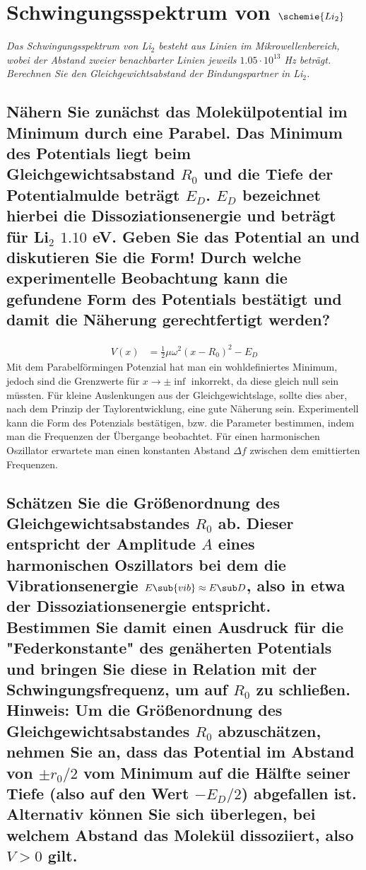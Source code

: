 \documentclass[ex]{exercise_4.1}
\begin{document}
\section{Schwingungsspektrum von \(\schemie{Li_2}\)}
{\it Das Schwingungsspektrum von Li$_2$ besteht aus Linien im Mikrowellenbereich, wobei der Abstand zweier benachbarter Linien jeweils $1.05 \cdot 10^{13}$ Hz beträgt. Berechnen Sie den Gleichgewichtsabstand der Bindungspartner in Li$_2$.}

\subsection{Nähern Sie zunächst das Molekülpotential im Minimum durch eine Parabel. Das Minimum des Potentials liegt beim Gleichgewichtsabstand $R_0$ und die Tiefe der Potentialmulde beträgt $E_D$. $E_D$ bezeichnet hierbei die Dissoziationsenergie und beträgt für Li$_2$ $1.10$ eV. Geben Sie das Potential an und diskutieren Sie die Form! Durch welche experimentelle Beobachtung kann die gefundene Form des Potentials bestätigt und damit die Näherung gerechtfertigt werden?}

\dottedlinete

\begin{align*}
    V(x) 
    &= \frac12\mu  \omega^2 (x- R_0)^2 - E_D
\end{align*}
Mit dem Parabelförmingen Potenzial hat man ein wohldefiniertes Minimum, jedoch sind die Grenzwerte für \(x\to \pm\inf\) inkorrekt, da diese gleich null sein müssten. Für kleine Auslenkungen aus der Gleichgewichtslage, sollte dies aber, nach dem Prinzip der Taylorentwicklung, eine gute Näherung sein. Experimentell kann die Form des Potenzials bestätigen, bzw. die Parameter bestimmen, indem man die Frequenzen der Übergange beobachtet. Für einen harmonischen Oszillator erwartete man einen konstanten Abstand \(\Delta f\) zwischen dem emittierten Frequenzen.

\subsection{Schätzen Sie die Größenordnung des Gleichgewichtsabstandes $R_0$ ab. Dieser entspricht der Amplitude $A$ eines harmonischen Oszillators bei dem die Vibrationsenergie $E\sub{vib} \approx E\sub D$, also in etwa der Dissoziationsenergie entspricht. \\
Bestimmen Sie damit einen Ausdruck für die "{}Federkonstante"{} des genäherten Potentials und bringen Sie diese in Relation mit der Schwingungsfrequenz, um auf $R_0$ zu schließen. \\
Hinweis: Um die Größenordnung des Gleichgewichtsabstandes $R_0$ abzuschätzen, nehmen Sie an, dass das Potential im Abstand von $\pm r_0/2$ vom Minimum auf die Hälfte seiner Tiefe (also auf den Wert $-E_D/2$) abgefallen ist. Alternativ können Sie sich überlegen, bei welchem Abstand das Molekül dissoziiert, also $V > 0$ gilt.}
\end{document}
